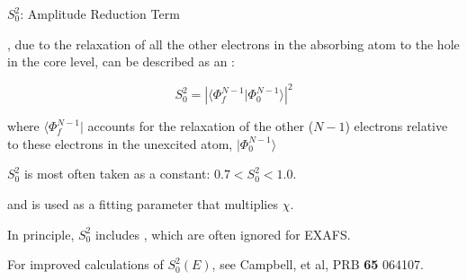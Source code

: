 \begin{slide}{$S_0^2$:  Amplitude Reduction Term}
  
\vmm
    
    {}, due to the relaxation of all the other
    electrons in the absorbing atom to the hole in the core level, can be
    described as an {}:

    \vmm

    \[
    S_0^2 =  {  |{\langle \Phi^{N-1}_f |\Phi^{N-1}_0 \rangle}|^2}
    \]

     \vspace{1mm}
     
     where ${\langle \Phi^{N-1}_f|}$ accounts for the relaxation of the
     other ($N-1$) electrons relative to these electrons in the unexcited
     atom, ${| \Phi^{N-1}_0 \rangle }$
     

     \vmm

     ${S_0^2}$ is most often taken as a constant: $ 0.7 < S_0^2 < 1.0 $.
    
 
     and is used as a fitting parameter that multiplies {$\chi$}.
     
     \vmm

     \begin{center}
       {}
     \end{center}

     \vmm

     \begin{center}
     \end{center}
     

     \vmm

     In principle, $S_0^2$  includes {},
     which are often ignored for EXAFS.
     
     \vmm
     
     For improved calculations of $S_0^2(E)$, see Campbell, et al, PRB
     {\bf{65}} 064107.


     \vmm

\vfill
\end{slide} 

